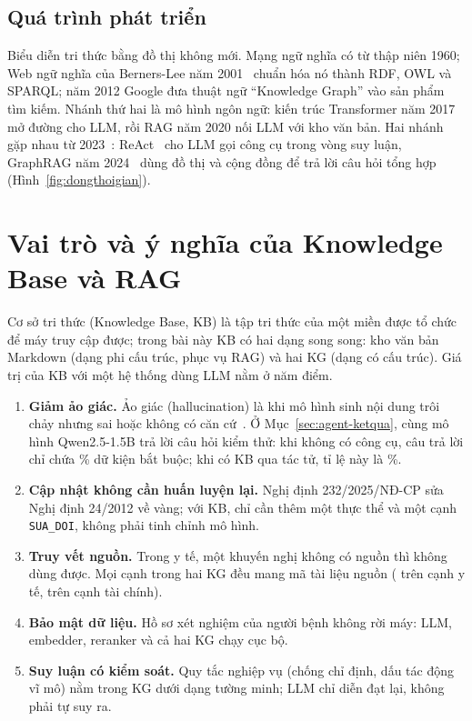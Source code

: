 \subsection{Quá trình phát triển}
Biểu diễn tri thức bằng đồ thị không mới. Mạng ngữ nghĩa có từ thập niên 1960; Web ngữ nghĩa của Berners-Lee năm
2001~\cite{bernerslee2001semantic} chuẩn hóa nó thành RDF, OWL và SPARQL; năm 2012 Google đưa thuật ngữ
``Knowledge Graph'' vào sản phẩm tìm kiếm. Nhánh thứ hai là mô hình ngôn ngữ: kiến trúc Transformer
năm 2017~\cite{vaswani2017attention} mở đường cho LLM, rồi RAG năm 2020 nối LLM với kho văn bản. Hai nhánh gặp
nhau từ 2023~\cite{pan2024unifying}: ReAct~\cite{yao2023react} cho LLM gọi công cụ trong vòng suy luận, GraphRAG năm
2024~\cite{edge2024graphrag} dùng đồ thị và cộng đồng để trả lời câu hỏi tổng hợp (Hình~\ref{fig:dongthoigian}).


\section{Vai trò và ý nghĩa của Knowledge Base và RAG}
Cơ sở tri thức (Knowledge Base, KB) là tập tri thức của một miền được tổ chức để máy truy cập được; trong bài này
KB có hai dạng song song: kho văn bản Markdown (dạng phi cấu trúc, phục vụ RAG) và hai KG (dạng có cấu trúc).
Giá trị của KB với một hệ thống dùng LLM nằm ở năm điểm.

\begin{enumerate}
  \item \textbf{Giảm ảo giác.} Ảo giác (hallucination) là khi mô hình sinh nội dung trôi chảy nhưng sai hoặc không
        có căn cứ~\cite{ji2023hallucination}. Ở Mục~\ref{sec:agent-ketqua}, cùng mô hình Qwen2.5-1.5B trả lời
         câu hỏi kiểm thử: khi không có công cụ, câu trả lời chỉ chứa
        \% dữ kiện bắt buộc; khi có KB qua tác tử, tỉ lệ này là
        \%.
  \item \textbf{Cập nhật không cần huấn luyện lại.} Nghị định 232/2025/NĐ-CP sửa Nghị định 24/2012 về vàng; với KB,
        chỉ cần thêm một thực thể và một cạnh \texttt{SUA\_DOI}, không phải tinh chỉnh mô hình.
  \item \textbf{Truy vết nguồn.} Trong y tế, một khuyến nghị không có nguồn thì không dùng được. Mọi cạnh trong
        hai KG đều mang mã tài liệu nguồn ( trên  cạnh y tế,
         trên  cạnh tài chính).
  \item \textbf{Bảo mật dữ liệu.} Hồ sơ xét nghiệm của người bệnh không rời máy: LLM, embedder, reranker và cả hai
        KG chạy cục bộ.
  \item \textbf{Suy luận có kiểm soát.} Quy tắc nghiệp vụ (chống chỉ định, dấu tác động vĩ mô) nằm trong KG dưới
        dạng tường minh; LLM chỉ diễn đạt lại, không phải tự suy ra.
\end{enumerate}

